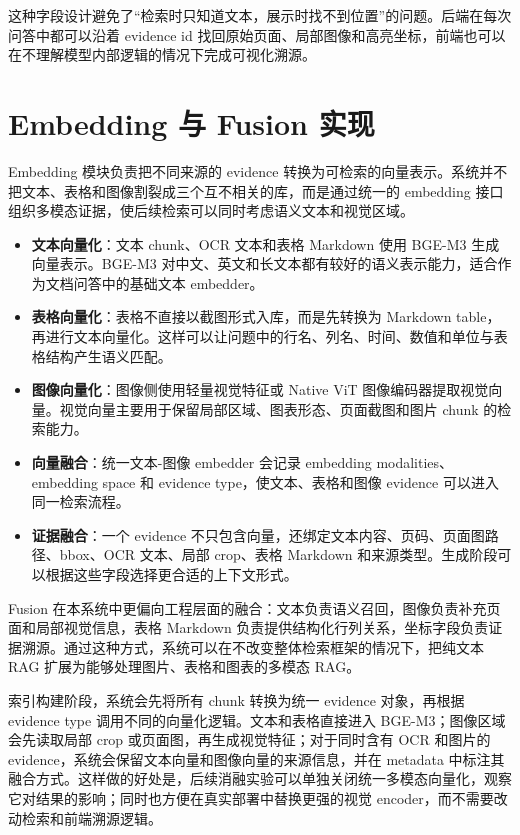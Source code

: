 这种字段设计避免了“检索时只知道文本，展示时找不到位置”的问题。后端在每次问答中都可以沿着 evidence id 找回原始页面、局部图像和高亮坐标，前端也可以在不理解模型内部逻辑的情况下完成可视化溯源。

\section{Embedding 与 Fusion 实现}

Embedding 模块负责把不同来源的 evidence 转换为可检索的向量表示。系统并不把文本、表格和图像割裂成三个互不相关的库，而是通过统一的 embedding 接口组织多模态证据，使后续检索可以同时考虑语义文本和视觉区域。

\begin{itemize}
  \item \textbf{文本向量化}：文本 chunk、OCR 文本和表格 Markdown 使用 BGE-M3 生成向量表示。BGE-M3 对中文、英文和长文本都有较好的语义表示能力，适合作为文档问答中的基础文本 embedder。
  \item \textbf{表格向量化}：表格不直接以截图形式入库，而是先转换为 Markdown table，再进行文本向量化。这样可以让问题中的行名、列名、时间、数值和单位与表格结构产生语义匹配。
  \item \textbf{图像向量化}：图像侧使用轻量视觉特征或 Native ViT 图像编码器提取视觉向量。视觉向量主要用于保留局部区域、图表形态、页面截图和图片 chunk 的检索能力。
  \item \textbf{向量融合}：统一文本-图像 embedder 会记录 embedding modalities、embedding space 和 evidence type，使文本、表格和图像 evidence 可以进入同一检索流程。
  \item \textbf{证据融合}：一个 evidence 不只包含向量，还绑定文本内容、页码、页面图路径、bbox、OCR 文本、局部 crop、表格 Markdown 和来源类型。生成阶段可以根据这些字段选择更合适的上下文形式。
\end{itemize}

Fusion 在本系统中更偏向工程层面的融合：文本负责语义召回，图像负责补充页面和局部视觉信息，表格 Markdown 负责提供结构化行列关系，坐标字段负责证据溯源。通过这种方式，系统可以在不改变整体检索框架的情况下，把纯文本 RAG 扩展为能够处理图片、表格和图表的多模态 RAG。

索引构建阶段，系统会先将所有 chunk 转换为统一 evidence 对象，再根据 evidence type 调用不同的向量化逻辑。文本和表格直接进入 BGE-M3；图像区域会先读取局部 crop 或页面图，再生成视觉特征；对于同时含有 OCR 和图片的 evidence，系统会保留文本向量和图像向量的来源信息，并在 metadata 中标注其融合方式。这样做的好处是，后续消融实验可以单独关闭统一多模态向量化，观察它对结果的影响；同时也方便在真实部署中替换更强的视觉 encoder，而不需要改动检索和前端溯源逻辑。

